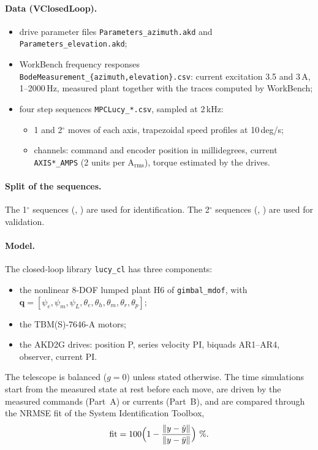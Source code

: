 \documentclass[10pt,a4paper]{article}
\numberwithin{equation}{section}
\begin{document}
\paragraph{Data (VClosedLoop).}
\begin{itemize}
\item drive parameter files \texttt{Parameters\_azimuth.akd} and \texttt{Parameters\_elevation.akd};
\item WorkBench frequency responses \texttt{BodeMeasurement\_\{azimuth,elevation\}.csv}: current excitation 3.5 and 3\,A, 1--2000\,Hz, measured plant together with the traces computed by WorkBench;
\item four step sequences \texttt{MPCLucy\_*.csv}, sampled at 2\,kHz:
  \begin{itemize}
  \item 1 and 2$^\circ$ moves of each axis, trapezoidal speed profiles at 10\,deg/s;
  \item channels: command and encoder position in millidegrees, current \texttt{AXIS*\_AMPS} (2 units per A$_\mathrm{rms}$), torque estimated by the drives.
  \end{itemize}
\end{itemize}

\paragraph{Split of the sequences.} The 1$^\circ$ sequences (, ) are used for identification. The 2$^\circ$ sequences (, ) are used for validation.

\paragraph{Model.} The closed-loop library \texttt{lucy\_cl} has three components:
\begin{itemize}
\item the nonlinear 8-DOF lumped plant H6 of \texttt{gimbal\_mdof}, with $\mathbf q=[\psi_e,\psi_m,\psi_L,\theta_e,\theta_h,\theta_m,\theta_r,\theta_p]$;
\item the TBM(S)-7646-A motors;
\item the AKD2G drives: position P, series velocity PI, biquads AR1--AR4, observer, current PI.
\end{itemize}
The telescope is balanced ($g=0$) unless stated otherwise. The time simulations start from the measured state at rest before each move, are driven by the measured commands (Part~A) or currents (Part~B), and are compared through the NRMSE fit of the System Identification Toolbox,
\begin{equation}
\mathrm{fit}=100\Bigl(1-\frac{\lVert y-\hat y\rVert}{\lVert y-\bar y\rVert}\Bigr)\ \%.
\end{equation}
\end{document}
